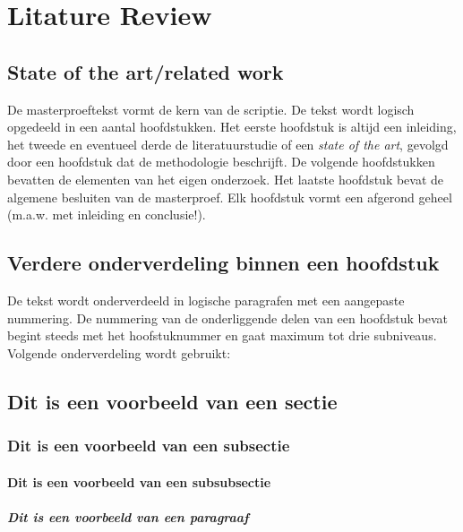 
\chapter{Litature Review}

\section{State of the art/related work}
De masterproeftekst vormt de kern van de scriptie. De tekst wordt logisch opgedeeld in een aantal hoofdstukken. Het eerste hoofdstuk is altijd een inleiding, het tweede en eventueel derde de literatuurstudie of een \textit{state of the art}, gevolgd door een hoofdstuk dat de methodologie beschrijft. De volgende hoofdstukken bevatten de elementen van het eigen onderzoek. Het laatste hoofdstuk bevat de algemene besluiten van de masterproef. Elk hoofdstuk vormt een afgerond geheel (m.a.w. met inleiding en conclusie!).

\section{Verdere onderverdeling binnen een hoofdstuk}
De tekst wordt onderverdeeld in logische paragrafen met een aangepaste nummering. De nummering van de onderliggende delen van een hoofdstuk bevat begint steeds met het hoofstuknummer en gaat maximum tot drie subniveaus. 
Volgende onderverdeling wordt gebruikt:

\section{Dit is een voorbeeld van een sectie}

\subsection{Dit is een voorbeeld van een subsectie}

\subsubsection{Dit is een voorbeeld van een subsubsectie}

\paragraph{Dit is een voorbeeld van een paragraaf}
